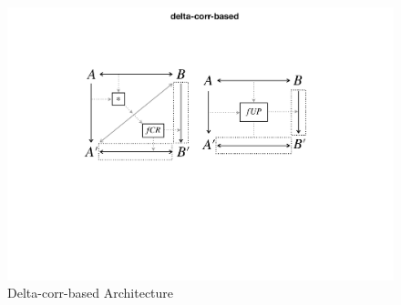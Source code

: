 \begin{figure}[tb!]
	\centering
	\includegraphics[width=0.75\columnwidth]{diagrams/delta-corr-based}
	\caption{Delta-corr-based Architecture}
	\label{fig:deltaCorrBased}
\end{figure}

\clearpage